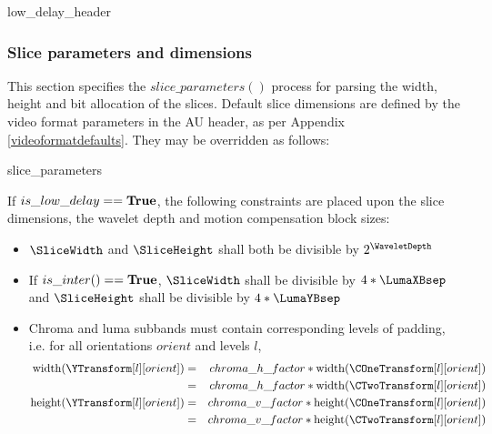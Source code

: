 \begin{pseudo}{low\_delay\_header}{}
\end{pseudo}

\subsubsection{Slice parameters and dimensions}
\label{sliceparams}

This section specifies the $slice\_parameters()$ process for parsing the width, height and bit allocation of 
the slices. Default slice dimensions are defined by the video format parameters in the AU header, as per Appendix 
\ref{videoformatdefaults}. They may be overridden as follows:

\begin{pseudo}{slice\_parameters}{}
\bsEND
{}
\bsEND
\end{pseudo}

If $is\_low\_delay==\text{\bf{True}}$, the following constraints are placed upon the slice dimensions, the wavelet depth
 and motion compensation block sizes:

\begin{itemize}
\item $\SliceWidth$ and $\SliceHeight$ shall both be divisible by $2^\WaveletDepth$
\item If $is\_inter()==\text{\bf{True}}$, $\SliceWidth$ shall be divisible by $4*\LumaXBsep$ and $\SliceHeight$ shall be divisible by $4*\LumaYBsep$
\item Chroma and luma subbands must contain corresponding levels of padding, i.e. for all orientations $orient$ and levels $l$,
\begin{eqnarray*}
\width(\YTransform[l][orient]) & = & chroma\_h\_factor*\width(\COneTransform[l][orient]) \\
& = & chroma\_h\_factor*\width(\CTwoTransform[l][orient]) \\
\height(\YTransform[l][orient]) & = & chroma\_v\_factor*\height(\COneTransform[l][orient]) \\
& = & chroma\_v\_factor*\height(\CTwoTransform[l][orient]) \\
\end{eqnarray*}
\end{itemize}

